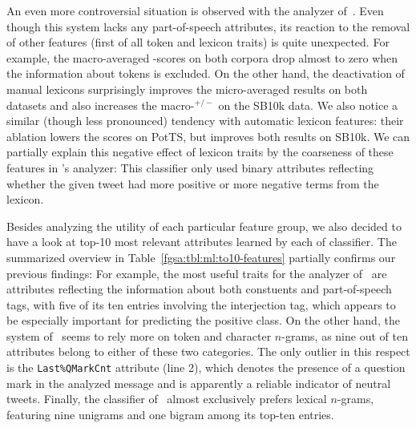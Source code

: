 An even more controversial situation is observed with the analyzer
of~\citet{Guenther:14}. Even though this system lacks any
part-of-speech attributes, its reaction to the removal of other
features (first of all token and lexicon traits) is quite unexpected.
For example, the macro-averaged \F{}-scores on both corpora drop
almost to zero when the information about tokens is excluded.  On the
other hand, the deactivation of manual lexicons surprisingly improves
the micro-averaged results on both datasets and also increases the
macro-\F{}$^{+/-}$ on the SB10k data.  We also notice a similar
(though less pronounced) tendency with automatic lexicon features:
their ablation lowers the scores on PotTS, but improves both results
on SB10k.  We can partially explain this negative effect of lexicon
traits by the coarseness of these features in
\citeauthor{Guenther:14}'s analyzer: This classifier only used binary
attributes reflecting whether the given tweet had more positive or
more negative terms from the lexicon.

Besides analyzing the utility of each particular feature group, we
also decided to have a look at top-10 most relevant attributes learned
by each of classifier.  The summarized overview in
Table~\ref{fgsa:tbl:ml:to10-features} partially confirms our previous
findings: For example, the most useful traits for the analyzer
of~\citet{Gamon:04} are attributes reflecting the information about
both constuents and part-of-speech tags, with five of its ten entries
involving the interjection tag, which appears to be especially
important for predicting the positive class.  On the other hand, the
system of~\citet{Mohammad:13} seems to rely more on token and
character $n$-grams, as nine out of ten attributes belong to either of
these two categories. The only outlier in this respect is the
\texttt{Last\%QMarkCnt} attribute (line 2), which denotes the presence
of a question mark in the analyzed message and is apparently a
reliable indicator of neutral tweets.  Finally, the classifier
of~\citet{Guenther:14} almost exclusively prefers lexical $n$-grams,
featuring nine unigrams and one bigram among its top-ten entries.

